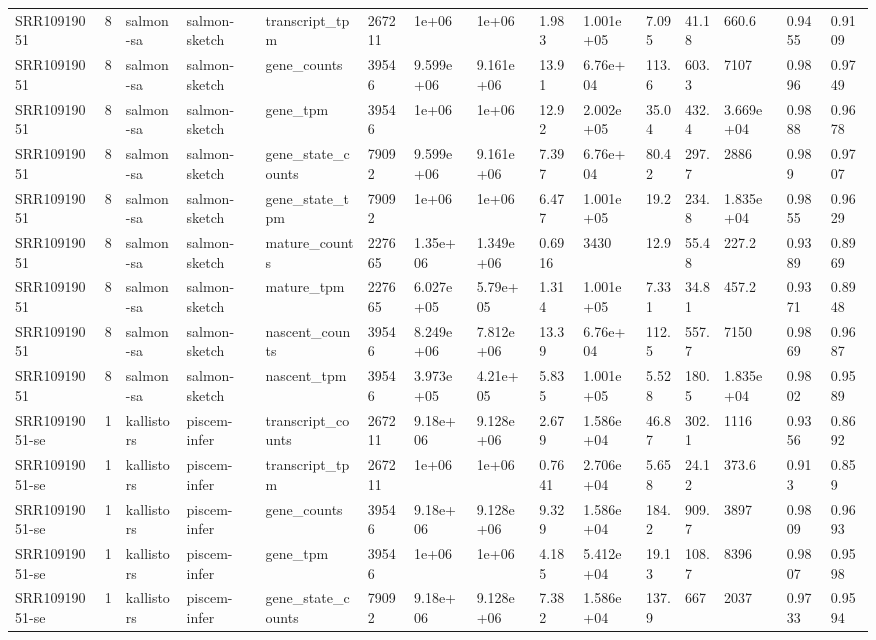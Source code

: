 \begin{tabular}{lllllllllllllll}
SRR10919051 & 8 & salmon-sa & salmon-sketch & transcript\_tpm & 267211 & 1e+06 & 1e+06 & 1.983 & 1.001e+05 & 7.095 & 41.18 & 660.6 & 0.9455 & 0.9109 \\
SRR10919051 & 8 & salmon-sa & salmon-sketch & gene\_counts & 39546 & 9.599e+06 & 9.161e+06 & 13.91 & 6.76e+04 & 113.6 & 603.3 & 7107 & 0.9896 & 0.9749 \\
SRR10919051 & 8 & salmon-sa & salmon-sketch & gene\_tpm & 39546 & 1e+06 & 1e+06 & 12.92 & 2.002e+05 & 35.04 & 432.4 & 3.669e+04 & 0.9888 & 0.9678 \\
SRR10919051 & 8 & salmon-sa & salmon-sketch & gene\_state\_counts & 79092 & 9.599e+06 & 9.161e+06 & 7.397 & 6.76e+04 & 80.42 & 297.7 & 2886 & 0.989 & 0.9707 \\
SRR10919051 & 8 & salmon-sa & salmon-sketch & gene\_state\_tpm & 79092 & 1e+06 & 1e+06 & 6.477 & 1.001e+05 & 19.2 & 234.8 & 1.835e+04 & 0.9855 & 0.9629 \\
SRR10919051 & 8 & salmon-sa & salmon-sketch & mature\_counts & 227665 & 1.35e+06 & 1.349e+06 & 0.6916 & 3430 & 12.9 & 55.48 & 227.2 & 0.9389 & 0.8969 \\
SRR10919051 & 8 & salmon-sa & salmon-sketch & mature\_tpm & 227665 & 6.027e+05 & 5.79e+05 & 1.314 & 1.001e+05 & 7.331 & 34.81 & 457.2 & 0.9371 & 0.8948 \\
SRR10919051 & 8 & salmon-sa & salmon-sketch & nascent\_counts & 39546 & 8.249e+06 & 7.812e+06 & 13.39 & 6.76e+04 & 112.5 & 557.7 & 7150 & 0.9869 & 0.9687 \\
SRR10919051 & 8 & salmon-sa & salmon-sketch & nascent\_tpm & 39546 & 3.973e+05 & 4.21e+05 & 5.835 & 1.001e+05 & 5.528 & 180.5 & 1.835e+04 & 0.9802 & 0.9589 \\
SRR10919051-se & 1 & kallistors & piscem-infer & transcript\_counts & 267211 & 9.18e+06 & 9.128e+06 & 2.679 & 1.586e+04 & 46.87 & 302.1 & 1116 & 0.9356 & 0.8692 \\
SRR10919051-se & 1 & kallistors & piscem-infer & transcript\_tpm & 267211 & 1e+06 & 1e+06 & 0.7641 & 2.706e+04 & 5.658 & 24.12 & 373.6 & 0.913 & 0.859 \\
SRR10919051-se & 1 & kallistors & piscem-infer & gene\_counts & 39546 & 9.18e+06 & 9.128e+06 & 9.329 & 1.586e+04 & 184.2 & 909.7 & 3897 & 0.9809 & 0.9693 \\
SRR10919051-se & 1 & kallistors & piscem-infer & gene\_tpm & 39546 & 1e+06 & 1e+06 & 4.185 & 5.412e+04 & 19.13 & 108.7 & 8396 & 0.9807 & 0.9598 \\
SRR10919051-se & 1 & kallistors & piscem-infer & gene\_state\_counts & 79092 & 9.18e+06 & 9.128e+06 & 7.382 & 1.586e+04 & 137.9 & 667 & 2037 & 0.9733 & 0.9594 \\

\end{tabular}

